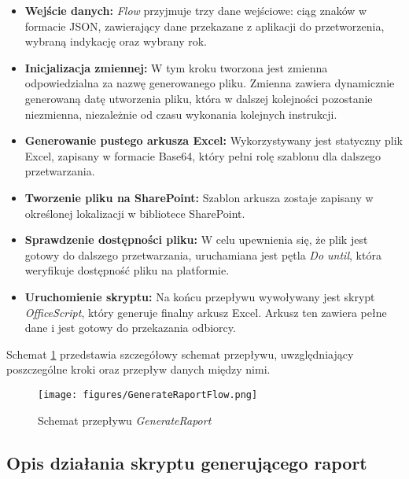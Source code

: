 \begin{itemize}
    \item \textbf{Wejście danych:} \emph{Flow} przyjmuje trzy dane wejściowe: ciąg znaków w formacie JSON, zawierający dane przekazane z aplikacji do przetworzenia, wybraną indykację oraz wybrany rok.
    \item \textbf{Inicjalizacja zmiennej:} W tym kroku tworzona jest zmienna odpowiedzialna za nazwę generowanego pliku. Zmienna zawiera dynamicznie generowaną datę utworzenia pliku, która w dalszej kolejności pozostanie niezmienna, niezależnie od czasu wykonania kolejnych instrukcji.
    \item \textbf{Generowanie pustego arkusza Excel:} Wykorzystywany jest statyczny plik Excel, zapisany w formacie Base64, który pełni rolę szablonu dla dalszego przetwarzania.
    \item \textbf{Tworzenie pliku na SharePoint:} Szablon arkusza zostaje zapisany w określonej lokalizacji w bibliotece SharePoint.
    \item \textbf{Sprawdzenie dostępności pliku:} W celu upewnienia się, że plik jest gotowy do dalszego przetwarzania, uruchamiana jest pętla \emph{Do until}, która weryfikuje dostępność pliku na platformie.
    \item \textbf{Uruchomienie skryptu:} Na końcu przepływu wywoływany jest skrypt \emph{OfficeScript}, który generuje finalny arkusz Excel. Arkusz ten zawiera pełne dane i jest gotowy do przekazania odbiorcy.
\end{itemize}

Schemat \ref{fig:generateflowcomponent} przedstawia szczegółowy schemat przepływu, uwzględniający poszczególne kroki oraz przepływ danych między nimi.

\begin{figure}[H]
    \centering
    \texttt{[image: figures/GenerateRaportFlow.png]}
    \caption{Schemat przepływu \emph{GenerateRaport}}
    \label{fig:generateflowcomponent}
\end{figure}

\subsection{Opis działania skryptu generującego raport}

